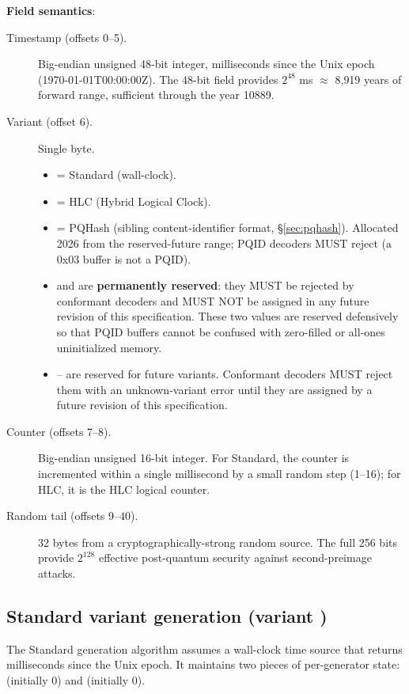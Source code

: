 \textbf{Field semantics}:
\begin{description}
  \item[Timestamp (offsets 0--5).] Big-endian unsigned 48-bit integer, milliseconds since the Unix epoch (1970-01-01T00:00:00Z). The 48-bit field provides $2^{48}$ ms $\approx$ 8{,}919 years of forward range, sufficient through the year 10889.
  \item[Variant (offset 6).] \label{sec:variant-reservation} Single byte.
    \begin{itemize}
      \item {} = Standard (wall-clock).
      \item {} = HLC (Hybrid Logical Clock).
      \item {} = PQHash (sibling content-identifier format, §\ref{sec:pqhash}). Allocated 2026 from the reserved-future range; PQID decoders MUST reject  (a 0x03 buffer is not a PQID).
      \item {} and  are \textbf{permanently reserved}: they MUST be rejected by conformant decoders and MUST NOT be assigned in any future revision of this specification. These two values are reserved defensively so that PQID buffers cannot be confused with zero-filled or all-ones uninitialized memory.
      \item {}-- are reserved for future variants. Conformant decoders MUST reject them with an unknown-variant error until they are assigned by a future revision of this specification.
    \end{itemize}
  \item[Counter (offsets 7--8).] Big-endian unsigned 16-bit integer. For Standard, the counter is incremented within a single millisecond by a small random step (1--16); for HLC, it is the HLC logical counter.
  \item[Random tail (offsets 9--40).] 32 bytes from a cryptographically-strong random source. The full 256 bits provide $2^{128}$ effective post-quantum security against second-preimage attacks.
\end{description}

\subsection{Standard variant generation (variant )}

The Standard generation algorithm assumes a wall-clock time source that returns milliseconds since the Unix epoch. It maintains two pieces of per-generator state:  (initially 0) and  (initially 0).

